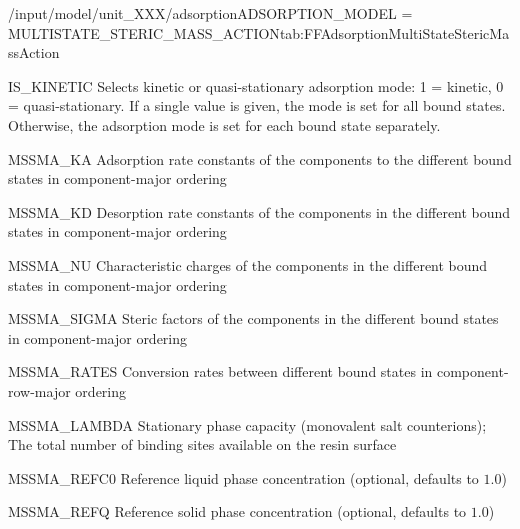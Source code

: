 \begin{condsubgroup}{/input/model/unit\_XXX/adsorption}{ADSORPTION\_MODEL = MULTISTATE\_STERIC\_MASS\_ACTION}{tab:FFAdsorptionMultiStateStericMassAction}
\begin{dataset}[type=int,range={$\{ 0,1 \}$},length={1 / \texttt{NTOTALBND}}]{IS\_KINETIC}
    Selects kinetic or quasi-stationary adsorption mode: 1 = kinetic, 0 = quasi-stationary.
    If a single value is given, the mode is set for all bound states.
    Otherwise, the adsorption mode is set for each bound state separately.
  \end{dataset}
  \begin{dataset}[unit=\si{\raiseto{3}\metre\of{MP}\per\raiseto{3}\metre\of{SP}\per\second}, type = double, range={$\geq 0$}, length={\texttt{NTOTALBND}}]{MSSMA\_KA} 
    Adsorption rate constants of the components to the different bound states in component-major ordering
  \end{dataset} 
  \begin{dataset}[unit=\si{\per\second} , type = double, range={$\geq 0$}, length={\texttt{NTOTALBND}}]{MSSMA\_KD} 
    Desorption rate constants of the components in the different bound states in component-major ordering
  \end{dataset} 
  \begin{dataset}[type = double, range={$\geq 0$}, length={\texttt{NTOTALBND}}]{MSSMA\_NU} 
    Characteristic charges of the components in the different bound states in component-major ordering
  \end{dataset} 
  \begin{dataset}[type = double, range={$\geq 0$}, length={\texttt{NTOTALBND}}]{MSSMA\_SIGMA} 
    Steric factors of the components in the different bound states in component-major ordering
  \end{dataset} 
  \begin{dataset}[unit=\si{\per\second}, type = double, range={$\geq 0$}, length={$\sum_{i=0}^{\texttt{NCOMP} - 1} \texttt{NBND}_i^2$}]{MSSMA\_RATES} 
    Conversion rates between different bound states in component-row-major ordering 
  \end{dataset}
  \begin{dataset}[unit=\si{\mol\per\cubic\metre\of{SP}}, type = double, range={$\geq 0$}, length={1}]{MSSMA\_LAMBDA} 
    Stationary phase capacity (monovalent salt counterions); The total number of binding sites available on the resin surface 
  \end{dataset}
  \begin{dataset}[unit=\si{\mol\per\raiseto{3}\metre\of{MP}}, type = double, range={$> 0$}, length={1}]{MSSMA\_REFC0} 
    Reference liquid phase concentration (optional, defaults to $1.0$) 
  \end{dataset} 
  \begin{dataset}[unit=\si{\mol\per\raiseto{3}\metre\of{SP}}, type = double, range={$> 0$}, length={1}]{MSSMA\_REFQ} 
    Reference solid phase concentration (optional, defaults to $1.0$)
  \end{dataset} 
\end{condsubgroup}

